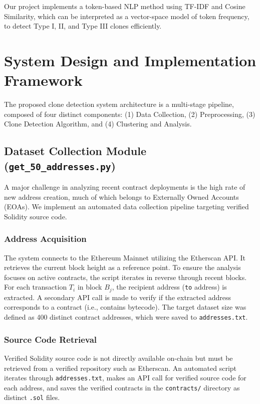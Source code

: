\documentclass[12pt,a4paper]{article}
\begin{document}
Our project implements a token-based NLP method using TF-IDF and Cosine Similarity, which can be interpreted as a vector-space model of token frequency, to detect Type I, II, and Type III clones efficiently.

\section{System Design and Implementation Framework}
The proposed clone detection system architecture is a multi-stage pipeline, composed of four distinct components: (1) Data Collection, (2) Preprocessing, (3) Clone Detection Algorithm, and (4) Clustering and Analysis.

\subsection{Dataset Collection Module (\texttt{get\_50\_addresses.py})}
A major challenge in analyzing recent contract deployments is the high rate of new address creation, much of which belongs to Externally Owned Accounts (EOAs). We implement an automated data collection pipeline targeting verified Solidity source code.

\subsubsection{Address Acquisition}
The system connects to the Ethereum Mainnet utilizing the Etherscan API. It retrieves the current block height as a reference point. To ensure the analysis focuses on active contracts, the script iterates in reverse through recent blocks. For each transaction $T_i$ in block $B_j$, the recipient address (\texttt{to} address) is extracted. A secondary API call is made to verify if the extracted address corresponds to a contract (i.e., contains bytecode). The target dataset size was defined as 400 distinct contract addresses, which were saved to \texttt{addresses.txt}. 

\subsubsection{Source Code Retrieval}
Verified Solidity source code is not directly available on-chain but must be retrieved from a verified repository such as Etherscan. An automated script iterates through \texttt{addresses.txt}, makes an API call for verified source code for each address, and saves the verified contracts in the \texttt{contracts/} directory as distinct \texttt{.sol} files. 
\end{document}
